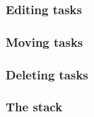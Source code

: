 \subsubsection{Editing tasks}

\subsubsection{Moving tasks}
\subsubsection{Deleting tasks}
\subsubsection{The stack}